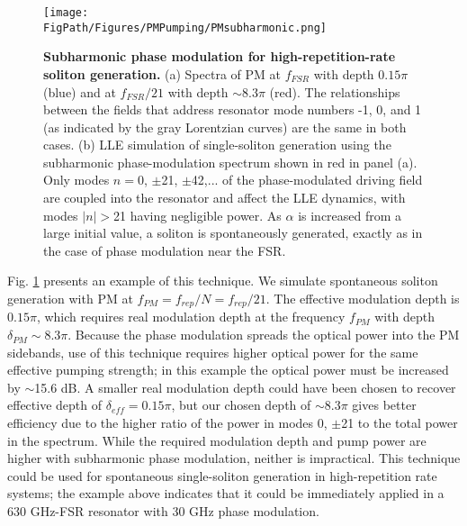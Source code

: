 \begin{figure}[htpb]
	\begin{center}
		\texttt{[image: \\FigPath/Figures/PMPumping/PMsubharmonic.png]}
	\end{center}
	\caption[Subharmonic phase modulation for high repetition-rate soliton generation]{\textbf{Subharmonic phase modulation for high-repetition-rate soliton generation.} (a) Spectra of PM at $f_{FSR}$ with depth $0.15\pi$ (blue) and at $f_{FSR}/21$ with depth $\sim$8.3$\pi$ (red). The relationships between the fields that address resonator mode numbers -1, 0, and 1 (as indicated by the gray Lorentzian curves) are the same in both cases. (b) LLE simulation of single-soliton generation using the subharmonic phase-modulation spectrum shown in red in panel (a). Only modes $n=0$, $\pm$21, $\pm$42,... of the phase-modulated driving field are coupled into the resonator and affect the LLE dynamics, with modes $|n|>$21 having negligible power. As $\alpha$ is increased from a large initial value, a soliton is spontaneously generated, exactly as in the case of phase modulation near the FSR.}
	\label{fig:PMsubharmonic}
\end{figure} 

Fig. \ref{fig:PMsubharmonic} presents an example of this technique. We simulate spontaneous soliton generation with PM at $f_{PM}=f_{rep}/N=f_{rep}/21$. The effective modulation depth is $0.15\pi$, which requires real modulation depth at the frequency $f_{PM}$ with depth $\delta_{PM}\sim8.3\pi$.  Because the phase modulation spreads the optical power into the PM sidebands, use of this technique requires higher optical power for the same effective pumping strength; in this example the optical power must be increased by $\sim$15.6 dB. A smaller real modulation depth could have been chosen to recover effective depth of $\delta_{eff}=0.15\pi$, but our chosen depth of $\sim8.3\pi$ gives better efficiency due to the higher ratio of the power in modes $0$, $\pm$21 to the total power in the spectrum. While the required modulation depth and pump power are higher with subharmonic phase modulation, neither is impractical. This technique could be used for spontaneous single-soliton generation in high-repetition rate systems; the example above indicates that it could be immediately applied in a 630 GHz-FSR resonator with 30 GHz phase modulation. 





